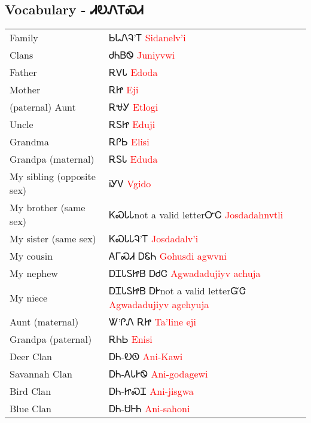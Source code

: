\newpage\subsection{Vocabulary - ᏗᎧᏁᎢᏍᏗ 
}
\begin{minipage}{\linewidth}
\begin{tabular}{p{5cm} p{9cm}}
Family & ᏏᏓᏁᎸ’Ꭲ 
 \newline \textcolor{red}{Sidanelv’i}\\
Clans & ᏧᏂᏴᏫ 
 \newline \textcolor{red}{Juniyvwi}\\
Father & ᎡᏙᏓ 
 \newline \textcolor{red}{Edoda}\\
Mother & ᎡᏥ 
 \newline \textcolor{red}{Eji}\\
(paternal) Aunt & ᎡᏠᎩ 
 \newline \textcolor{red}{Etlogi}\\
Uncle & ᎡᏚᏥ 
 \newline \textcolor{red}{Eduji}\\
Grandma & ᎡᎵᏏ 
 \newline \textcolor{red}{Elisi}\\
Grandpa (maternal) & ᎡᏚᏓ 
 \newline \textcolor{red}{Eduda}\\
My sibling (opposite sex) & ᎥᎩᏙ 
 \newline \textcolor{red}{Vgido}\\
My brother (same sex) & ᏦᏍᏓᏓnot a valid letterᏅᏟ 
 \newline \textcolor{red}{Josdadahnvtli}\\
My sister (same sex) & ᏦᏍᏓᏓᎸ’Ꭲ 
 \newline \textcolor{red}{Josdadalv’i}\\
My cousin & ᎪᎱᏍᏗ ᎠᏋᏂ 
 \newline \textcolor{red}{Gohusdi agwvni}\\
My nephew & ᎠᏆᏓᏚᏥᏴ ᎠᏧᏣ 
 \newline \textcolor{red}{Agwadadujiyv achuja}\\
My niece & ᎠᏆᏓᏚᏥᏴ ᎠᎨnot a valid letterᏳᏣ 
 \newline \textcolor{red}{Agwadadujiyv agehyuja}\\
Aunt (maternal) & Ꮤ’ᎵᏁ ᎡᏥ 
 \newline \textcolor{red}{Ta’line eji}\\
Grandpa (paternal) & ᎡᏂᏏ 
 \newline \textcolor{red}{Enisi}\\
Deer Clan & ᎠᏂ-ᎧᏫ 
 \newline \textcolor{red}{Ani-Kawi}\\
Savannah Clan & ᎠᏂ-ᎪᏓᎨᏫ 
 \newline \textcolor{red}{Ani-godagewi}\\
Bird Clan & ᎠᏂ-ᏥᏍᏆ 
 \newline \textcolor{red}{Ani-jisgwa}\\
Blue Clan & ᎠᏂ-ᏌᎰᏂ 
 \newline \textcolor{red}{Ani-sahoni}\\
\end{tabular}
\end{minipage}

